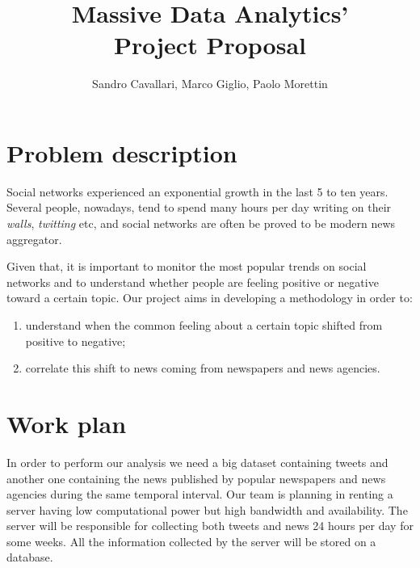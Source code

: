 \documentclass[a4paper]{article}
\begin{document}
\title{Massive Data Analytics'\\Project Proposal}
\author{Sandro Cavallari, Marco Giglio, Paolo Morettin}
\maketitle

\section{Problem description}
Social networks experienced an exponential growth in the last 5 to ten years.
Several people, nowadays, tend to spend many hours per day writing on their
\emph{walls}, \emph{twitting} etc, and social networks are often be proved to be
modern news aggregator.

Given that, it is important to monitor the most popular trends on social
networks and to understand whether people are feeling positive or negative
toward a certain topic. Our project aims in developing a methodology in order
to:
\begin{enumerate}
\item understand when the common feeling about a certain topic shifted from positive
to negative;
\item correlate this shift to news coming from newspapers and news agencies.
\end{enumerate}

\section{Work plan}
In order to perform our analysis we need a big dataset containing tweets and
another one containing the news published by popular newspapers and news
agencies during the same temporal interval. Our team is planning in renting a
server having low computational power but high bandwidth and availability. The
server will be responsible for collecting both tweets and news 24 hours per day
for some weeks. All the information collected by the server will be stored on a
database.
\end{document}
